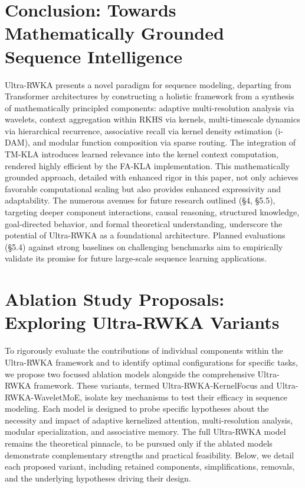 \documentclass{article}
\begin{document}
\section{Conclusion: Towards Mathematically Grounded Sequence Intelligence}
Ultra-RWKA presents a novel paradigm for sequence modeling, departing from Transformer architectures by constructing a holistic framework from a synthesis of mathematically principled components: adaptive multi-resolution analysis via wavelets, context aggregation within RKHS via kernels, multi-timescale dynamics via hierarchical recurrence, associative recall via kernel density estimation (i-DAM), and modular function composition via sparse routing. The integration of TM-KLA introduces learned relevance into the kernel context computation, rendered highly efficient by the FA-KLA implementation. This mathematically grounded approach, detailed with enhanced rigor in this paper, not only achieves favorable computational scaling but also provides enhanced expressivity and adaptability. The numerous avenues for future research outlined (\S4, \S5.5), targeting deeper component interactions, causal reasoning, structured knowledge, goal-directed behavior, and formal theoretical understanding, underscore the potential of Ultra-RWKA as a foundational architecture. Planned evaluations (\S5.4) against strong baselines on challenging benchmarks aim to empirically validate its promise for future large-scale sequence learning applications.


\section{Ablation Study Proposals: Exploring Ultra-RWKA Variants}
To rigorously evaluate the contributions of individual components within the Ultra-RWKA framework and to identify optimal configurations for specific tasks, we propose two focused ablation models alongside the comprehensive Ultra-RWKA framework. These variants, termed Ultra-RWKA-KernelFocus and Ultra-RWKA-WaveletMoE, isolate key mechanisms to test their efficacy in sequence modeling. Each model is designed to probe specific hypotheses about the necessity and impact of adaptive kernelized attention, multi-resolution analysis, modular specialization, and associative memory. The full Ultra-RWKA model remains the theoretical pinnacle, to be pursued only if the ablated models demonstrate complementary strengths and practical feasibility. Below, we detail each proposed variant, including retained components, simplifications, removals, and the underlying hypotheses driving their design.
\end{document}
